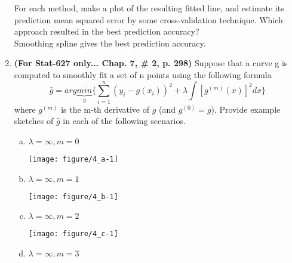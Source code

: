 \documentclass[12pt,fleqn]{article}\usepackage[]{graphicx}\usepackage[]{color}
\newenvironment{knitrout}{}{} %
\theoremstyle{definition}
\begin{document}
\begin{enumerate}[1.]
\begin{enumerate}[(a)]
        \end{enumerate}
    For each method, make a plot of the resulting fitted line, and estimate its prediction mean squared error by some cross-validation technique. Which approach resulted in the best prediction accuracy?\\[5pt]
    Smoothing spline gives the best prediction accuracy.
    \item \textbf{(For Stat-627 only... Chap. 7, \# 2, p. 298)} Suppose that a curve g is computed to smoothly fit a set of n points using the following formula
    $$\hat{g} = arg \underbrace{min}_{g}\{\sum^{n}_{i=1} (y_i - g(x_i))^2 + \lambda\int[g^{(m)}(x)]^2 dx \}$$
    where $g^{(m)}$ is the m-th derivative of $g$ (and $g^{(0)} = g$). Provide example sketches of $\hat{g}$ in each of the following scenarios.
        \begin{enumerate}[(a)]


          \item $\lambda = \infty, m= 0$
\begin{knitrout}
\color{fgcolor}

{\centering \texttt{[image: figure/4\_a-1]} 

}



\end{knitrout}

          \item $\lambda = \infty, m= 1$
\begin{knitrout}
\color{fgcolor}

{\centering \texttt{[image: figure/4\_b-1]} 

}



\end{knitrout}

          \item $\lambda = \infty, m= 2$
\begin{knitrout}
\color{fgcolor}

{\centering \texttt{[image: figure/4\_c-1]} 

}



\end{knitrout}

          \item $\lambda = \infty, m= 3$
\begin{knitrout}
\color{fgcolor}


\end{knitrout}
\end{enumerate}
\end{enumerate}
\end{document}
